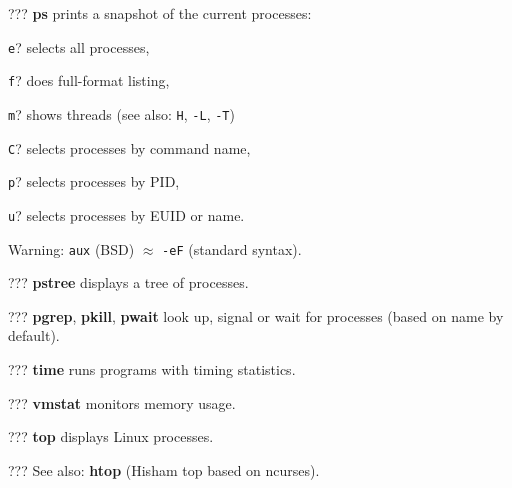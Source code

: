 \begin{compactenum}
	\item [???] \textbf{ps} prints a snapshot of the current processes:
	\item [\texttt{e}?] selects all processes,
	\item [\texttt{f}?] does full-format listing,
	\item [\texttt{m}?] shows threads (see also: \texttt{H}, \texttt{-L}, \texttt{-T})
	\item [\texttt{C}?] selects processes by command name,
	\item [\texttt{p}?] selects processes by PID,
	\item [\texttt{u}?] selects processes by EUID or name. 
	\item [] Warning: \texttt{aux} (BSD) $\approx$ \texttt{-eF} (standard syntax).
	\item [???] \textbf{pstree} displays a tree of processes.
\end{compactenum}

\begin{compactenum}
	\item [???] \textbf{pgrep}, \textbf{pkill}, \textbf{pwait} look up, signal or wait for processes (based on name by default).
\end{compactenum}

\begin{compactenum}
	\item [???] \textbf{time} runs programs with timing statistics.
\end{compactenum}

\begin{compactenum}
	\item [???] \textbf{vmstat} monitors memory usage.
	\item [???] \textbf{top} displays Linux processes.
	\item [???] See also: \textbf{htop} (Hisham top based on ncurses).
\end{compactenum}
